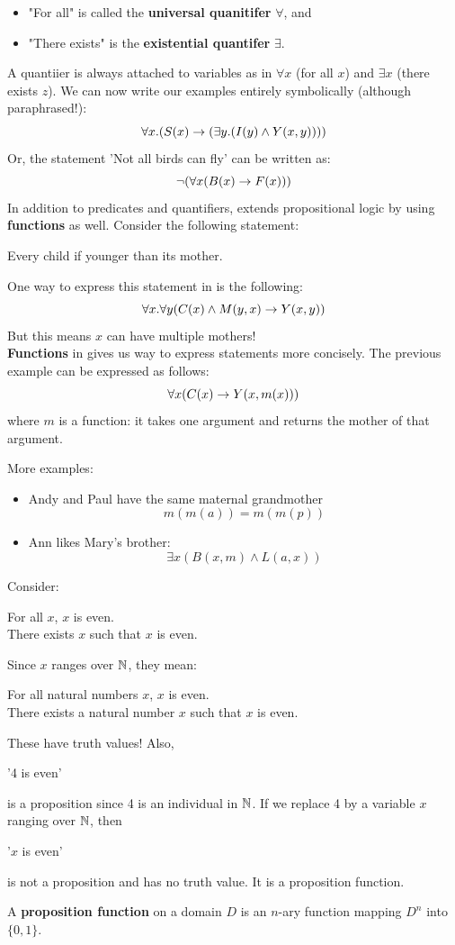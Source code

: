 \documentclass[english, 11pt]{article}
\begin{document}
\begin{defn}
\begin{itemize}
      \end{itemize}
    \begin{itemize}
      \item "For all" is called the \textbf{universal quanitifer} $\forall$, and
      \item "There exists" is the \textbf{existential quantifer} $\exists$.
    \end{itemize}
    A quantiier is always attached to variables as in $\forall x$ (for all $x$) and $\exists x$ (there exists $z$). We can now write our examples entirely symbolically (although paraphrased!):
    \[ \forall x.(S(x) \rightarrow (\exists y.(I(y) \land Y(x,y)))) \]
    Or, the statement 'Not all birds can fly' can be written as:
    \[ \neg(\forall x (B(x) \rightarrow F(x))) \]
    In addition to predicates and quantifiers,  extends propositional logic by using \textbf{functions} as well. Consider the following statement:
    \begin{center}
      Every child if younger than its mother.
    \end{center}
    One way to express this statement in  is the following:
    \[ \forall x . \forall y (C(x) \land M(y,x) \rightarrow Y(x,y)) \]
    But this means $x$ can have multiple mothers! \\
    \textbf{Functions} in  gives us way to express statements more concisely. The previous example can be expressed as follows:
    \[ \forall x (C(x) \rightarrow Y(x,m(x))) \]
    where $m$ is a function: it takes one argument and returns the mother of that argument.
  \end{defn}
  More examples:
  \begin{itemize}
    \item Andy and Paul have the same maternal grandmother
    \[ m(m(a)) = m(m(p))\]
    \item Ann likes Mary's brother:
    \[ \exists x (B(x,m) \land L(a,x)) \]
  \end{itemize}
  Consider:
  \begin{center}
    For all $x$, $x$ is even. \\ There exists $x$ such that $x$ is even.
  \end{center}
  Since $x$ ranges over ${\mathbb{N}}$, they mean:
  \begin{center}
    For all natural numbers $x$, $x$ is even. \\ There exists a natural number $x$ such that $x$ is even.
  \end{center}
  These have truth values! Also,
  \begin{center}
    '4 is even'
  \end{center}
  is a proposition since 4 is an individual in ${\mathbb{N}}$. If we replace 4 by a variable $x$ ranging over ${\mathbb{N}}$, then
  \begin{center}
    '$x$ is even'
  \end{center}
  is not a proposition and has no truth value. It is a proposition function.
  \begin{defn}\label{proposition function}
  A \textbf{proposition function} on a domain $D$ is an $n$-ary function mapping $D^n$ into $\{0,1\}$.
  \end{defn}
\end{document}
